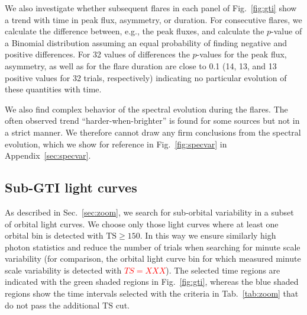\documentclass[twocolumn,linenumbers]{aastex62}
\newcommand{\todo}[1]{\textbf{\textcolor{red}{#1}}}
\begin{document}
We also investigate whether subsequent flares in each panel of Fig.~\ref{fig:gti} show a trend with time in peak flux, asymmetry, or duration. 
For consecutive flares, we calculate the difference between, e.g., the peak fluxes, and calculate the $p$-value of a Binomial distribution assuming an equal probability of finding negative and positive differences.
For 32 values of differences the $p$-values for the peak flux, asymmetry, as well as for the flare duration are close to 0.1 (14, 13, and 13 positive values for 32 trials, respectively) indicating no particular evolution of these quantities with time. 

We also find complex behavior of the spectral evolution during the flares. The often observed trend ``harder-when-brighter'' is found  for some sources but not in a strict manner. 
We therefore cannot draw any firm conclusions from the spectral evolution, which we show for reference in Fig.~\ref{fig:specvar} in  Appendix~\ref{sec:specvar}. 



\subsection{Sub-GTI light curves}
\label{sec:sub-gti}
As described in Sec.~\ref{sec:zoom}, we search for sub-orbital variability in a subset of orbital light curves. 
We choose only those light curves where at least one orbital bin is detected with $\mathrm{TS} \geqslant 150$. 
In this way we ensure similarly high photon statistics and reduce the number of trials when searching for minute scale variability (for comparison, the orbital light curve bin for which \citet{TheFermi-LAT:2016dss} measured minute scale variability is detected with \todo{$TS = XXX$}). 
The selected time regions are indicated with the green shaded regions in Fig.~\ref{fig:gti}, whereas the blue shaded regions show the time intervals selected with the criteria in Tab.~\ref{tab:zoom} that do not pass the additional $\mathrm{TS}$ cut.
\end{document}
